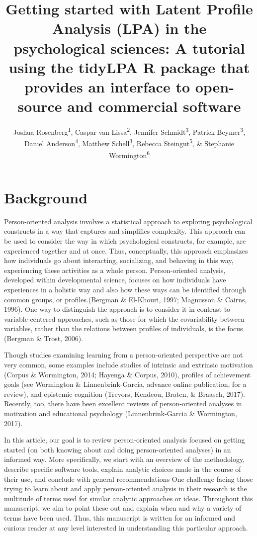 \documentclass[man]{apa6}
\title{Getting started with Latent Profile Analysis (LPA) in the psychological
sciences: A tutorial using the tidyLPA R package that provides an
interface to open-source and commercial software}
\author{Joshua Rosenberg\textsuperscript{1}, Caspar van
Lissa\textsuperscript{2}, Jennifer Schmidt\textsuperscript{3}, Patrick
Beymer\textsuperscript{3}, Daniel Anderson\textsuperscript{4}, Matthew
Schell\textsuperscript{3}, Rebecca Steingut\textsuperscript{5}, \&
Stephanie Wormington\textsuperscript{6}}
\date{}
\affiliation{
\vspace{0.5cm}
\textsuperscript{1} University of Tennessee, Knoxville\\\textsuperscript{2} Utrecht University\\\textsuperscript{3} Michigan State University\\\textsuperscript{4} University of Oregon\\\textsuperscript{5} Columbia University\\\textsuperscript{6} University of Virginia}
\begin{document}
\maketitle

\section{Background}\label{background}

Person-oriented analysis involves a statistical approach to exploring
psychological constructs in a way that captures and simplifies
complexity. This approach can be used to consider the way in which
psychological constructs, for example, are experienced together and at
once. Thus, conceptually, this approach emphasizes how individuals go
about interacting, socializing, and behaving in this way, experiencing
these activities as a whole person. Person-oriented analysis, developed
within developmental science, focuses on how individuals have
experiences in a holistic way and also how these ways can be identified
through common groups, or profiles.(Bergman \& El-Khouri, 1997;
Magnusson \& Cairns, 1996). One way to distinguish the approach is to
consider it in contrast to variable-centered approaches, such as those
for which the covariability between variables, rather than the relations
between profiles of individuals, is the focus (Bergman \& Trost, 2006).

Though studies examining learning from a person-oriented perspective are
not very common, some examples include studies of intrinsic and
extrinsic motivation (Corpus \& Wormington, 2014; Hayenga \& Corpus,
2010), profiles of achievement goals (see Wormington \&
Linnenbrink-Garcia, advance online publication, for a review), and
epistemic cognition (Trevors, Kendeou, Braten, \& Braasch, 2017).
Recently, too, there have been excellent reviews of person-oriented
analyses in motivation and educational psychology (Linnenbrink-Garcia \&
Wormington, 2017).

In this article, our goal is to review person-oriented analysis focused
on getting started (on both knowing about and doing person-oriented
analyses) in an informed way. More specifically, we start with an
overview of the methodology, describe specific software tools, explain
analytic choices made in the course of their use, and conclude with
general recommendations One challenge facing those trying to learn about
and apply person-oriented analysis in their research is the multitude of
terms used for similar analytic approaches or ideas. Throughout this
manuscript, we aim to point these out and explain when and why a variety
of terms have been used. Thus, this manuscript is written for an
informed and curious reader at any level interested in understanding
this particular approach.
\end{document}
